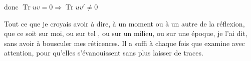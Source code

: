 donc \quad $\operatorname{Tr}uv=0\Longrightarrow\operatorname{Tr}uv'\ne0$


Tout ce que je croyais avoir à dire, à un moment ou à un autre de la réflexion, que ce soit sur moi, ou sur tel , ou sur un milieu, ou sur\unsure{,} une époque, je l'ai dit, sans  avoir à bousculer mes réticences.  Il a suffi à chaque fois que  examine avec attention,  pour qu'elles s'évanouissent\deleted{\unsure{,}} sans plus laisser de traces.

